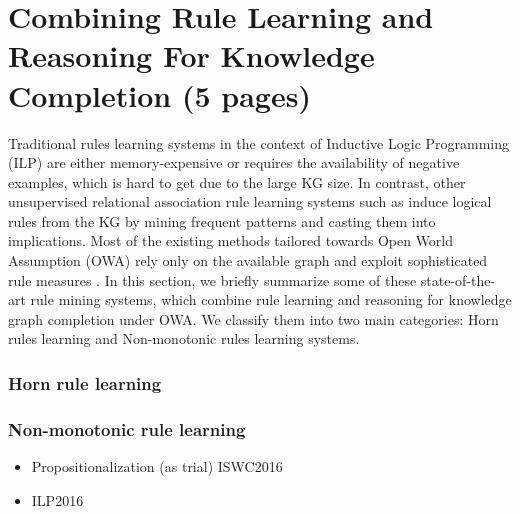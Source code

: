 \section{Combining Rule Learning and Reasoning For Knowledge Completion (5 pages)}
\label{sec:rules_kg_completion}
Traditional rules learning systems in the context of Inductive Logic Programming (ILP) \cite{probfoil,DBLP:conf/ijcai/RaedtDTBV15,DBLP:conf/clima/CorapiSIR11} are either memory-expensive or requires the availability of negative examples, which is hard to get due to the large KG size. In contrast, other unsupervised relational 
association rule learning systems such as \cite{DBLP:conf/esf/GoethalsB02,amie} induce logical rules from the KG by mining frequent patterns and casting them into implications. Most of the  existing methods tailored towards Open World Assumption (OWA) rely only on the available graph and exploit sophisticated rule measures \cite{amie,Chen:2016:OP:2882903.2882954, rumis}.
In this section, we briefly summarize some of these state-of-the-art rule mining systems, which combine rule learning and reasoning for knowledge graph completion under OWA. We classify them into two main categories: Horn rules learning and Non-monotonic rules learning systems.
\subsubsection{Horn rule learning}

\subsubsection{Non-monotonic rule learning}
\begin{itemize}
\item Propositionalization (as trial) ISWC2016
\item ILP2016

\end{itemize}


